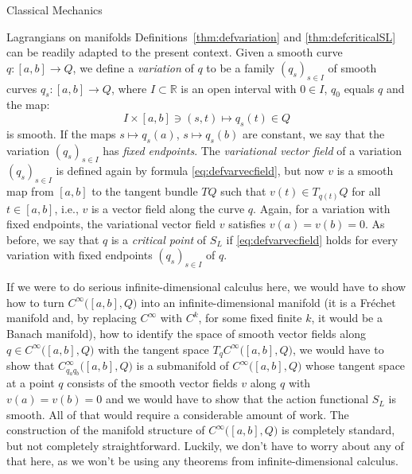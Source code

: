 \documentclass[oneside,a4paper,11pt]{amsbook}
\newcommand{\R}{\mathds R}
\theoremstyle{remark}\newtheorem{exercise}{Exercise}[chapter]
\theoremstyle{plain}\newtheorem{teo}{Theorem}[section]
\theoremstyle{plain}\newtheorem{lem}[teo]{Lemma}
\theoremstyle{plain}\newtheorem{prop}[teo]{Proposition}
\theoremstyle{plain}\newtheorem{cor}[teo]{Corollary}
\theoremstyle{definition}\newtheorem{defin}[teo]{Definition}
\theoremstyle{remark}\newtheorem{rem}[teo]{Remark}
\theoremstyle{definition}\newtheorem{notation}[teo]{Notation}
\theoremstyle{definition}\newtheorem{convention}[teo]{Convention}
\theoremstyle{definition}\newtheorem{example}[teo]{Example}
\numberwithin{section}{chapter}
\numberwithin{equation}{section}
\begin{document}
\begin{chapter}{Classical Mechanics}
\begin{section}{Lagrangians on manifolds}
Definitions~\ref{thm:defvariation} and \ref{thm:defcriticalSL} can be readily adapted to the present context.
Given a smooth curve $q:[a,b]\to Q$, we define a {\em variation\/} of $q$ to be a family $(q_s)_{s\in I}$ of
smooth curves $q_s:[a,b]\to Q$, where $I\subset\R$ is an open interval with $0\in I$, $q_0$ equals $q$ and the map:
\[I\times[a,b]\ni(s,t)\longmapsto q_s(t)\in Q\]
is smooth. If the maps $s\mapsto q_s(a)$, $s\mapsto q_s(b)$ are constant, we say that the variation $(q_s)_{s\in I}$
has {\em fixed endpoints}. The {\em variational vector field\/} of a variation $(q_s)_{s\in I}$ is defined
again by formula \eqref{eq:defvarvecfield}, but now $v$ is a smooth map from $[a,b]$ to the tangent bundle $TQ$ such
that $v(t)\in T_{q(t)}Q$ for all $t\in[a,b]$, i.e., $v$ is a vector field along the curve $q$. Again, for a variation
with fixed endpoints, the variational vector field $v$ satisfies $v(a)=v(b)=0$. As before, we say that
$q$ is a {\em critical point\/} of $S_L$ if \eqref{eq:defvarvecfield} holds for every variation with fixed
endpoints $(q_s)_{s\in I}$ of $q$.

If we were to do serious infinite-dimensional calculus here, we would have to show how to turn $C^\infty\big([a,b],Q\big)$
into an infinite-dimensional manifold (it is a Fr\'echet manifold and, by replacing $C^\infty$ with $C^k$, for
some fixed finite $k$, it would be a Banach manifold), how to identify the space of smooth vector fields along
$q\in C^\infty\big([a,b],Q\big)$ with the tangent space $T_q C^\infty\big([a,b],Q\big)$, we would have to show
that $C^\infty_{q_aq_b}\big([a,b],Q\big)$ is a submanifold of $C^\infty\big([a,b],Q\big)$ whose tangent space at
a point $q$ consists of the smooth vector fields $v$ along $q$ with $v(a)=v(b)=0$ and we would have to show that the action
functional $S_L$ is smooth. All of that would require a considerable amount of work. The construction of the manifold
structure of $C^\infty\big([a,b],Q\big)$ is completely standard, but not completely straightforward. Luckily, we don't
have to worry about any of that here, as we won't be using any theorems from infinite-dimensional calculus.


\end{section}
\end{chapter}
\end{document}
